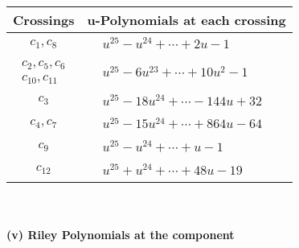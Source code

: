\documentclass[1p]{elsarticle_modified}
\theoremstyle{definition}
\begin{document}
\begin{tabular}{m{50pt}|m{274pt}}
Crossings & \hspace{64pt}u-Polynomials at each crossing \\
\hline $$\begin{aligned}c_{1},c_{8}\end{aligned}$$&$\begin{aligned}
&u^{25}- u^{24}+\cdots+2 u-1
\end{aligned}$\\
\hline $$\begin{aligned}c_{2},c_{5},c_{6}\\c_{10},c_{11}\end{aligned}$$&$\begin{aligned}
&u^{25}-6 u^{23}+\cdots+10 u^2-1
\end{aligned}$\\
\hline $$\begin{aligned}c_{3}\end{aligned}$$&$\begin{aligned}
&u^{25}-18 u^{24}+\cdots-144 u+32
\end{aligned}$\\
\hline $$\begin{aligned}c_{4},c_{7}\end{aligned}$$&$\begin{aligned}
&u^{25}-15 u^{24}+\cdots+864 u-64
\end{aligned}$\\
\hline $$\begin{aligned}c_{9}\end{aligned}$$&$\begin{aligned}
&u^{25}- u^{24}+\cdots+u-1
\end{aligned}$\\
\hline $$\begin{aligned}c_{12}\end{aligned}$$&$\begin{aligned}
&u^{25}+u^{24}+\cdots+48 u-19
\end{aligned}$\\
\hline
\end{tabular}\\~\\
\newpage\renewcommand{\arraystretch}{1}
\flushleft \textbf{(v) Riley Polynomials at the component}\newline \\
\end{document}
